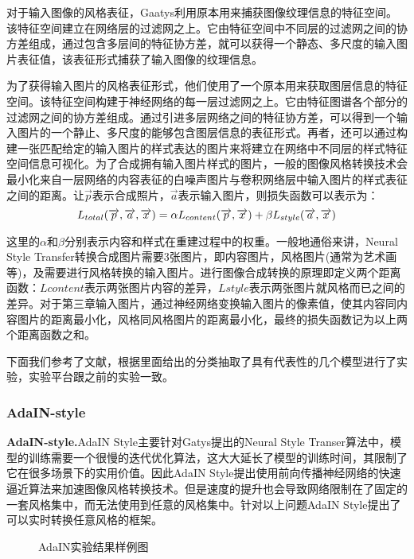 对于输入图像的风格表征，Gaatys利用原本用来捕获图像纹理信息的特征空间。该特征空间建立在网络层的过滤网之上。它由特征空间中不同层的过滤网之间的协方差组成，通过包含多层间的特征协方差，就可以获得一个静态、多尺度的输入图片表征值，该表征形式捕获了输入图像的纹理信息。

为了获得输入图片的风格表征形式，他们使用了一个原本用来获取图层信息的特征空间。该特征空间构建于神经网络的每一层过滤网之上。它由特征图谱各个部分的过滤网之间的协方差组成。通过引进多层网络之间的特征协方差，可以得到一个输入图片的一个静止、多尺度的能够包含图层信息的表征形式。再者，还可以通过构建一张匹配给定的输入图片的样式表达的图片来将建立在网络中不同层的样式特征空间信息可视化。为了合成拥有输入图片样式的图片，一般的图像风格转换技术会最小化来自一层网络的内容表征的白噪声图片与卷积网络层中输入图片的样式表征之间的距离。让$\overrightarrow{p}$表示合成照片，$\overrightarrow{a}$表示输入图片，则损失函数可以表示为：
$$
\centering
L_{total}(\overrightarrow{p},\overrightarrow{a}, \overrightarrow{x})=
\alpha L_{content}(\overrightarrow{p}, \overrightarrow{x}) +
\beta L_{style}(\overrightarrow{a}, \overrightarrow{x})
$$

这里的$\alpha$和$\beta$分别表示内容和样式在重建过程中的权重。一般地通俗来讲，Neural Style Transfer转换合成图片需要3张图片，即内容图片，风格图片(通常为艺术画等)，及需要进行风格转换的输入图片。进行图像合成转换的原理即定义两个距离函数：$Lcontent$表示两张图片内容的差异，$Lstyle$表示两张图片就风格而已之间的差异。对于第三章输入图片，通过神经网络变换输入图片的像素值，使其内容同内容图片的距离最小化，风格同风格图片的距离最小化，最终的损失函数记为以上两个距离函数之和。 

下面我们参考了文献\cite{nst-survey}，根据里面给出的分类抽取了具有代表性的几个模型进行了实验，实验平台跟之前的实验一致。

\subsubsection[AdaIN-style]{AdaIN-style}

\textbf{AdaIN-style.}\cite{adain}\quad AdaIN Style主要针对Gatys提出的Neural Style Transer算法中，模型的训练需要一个很慢的迭代优化算法，这大大延长了模型的训练时间，其限制了它在很多场景下的实用价值。因此AdaIN Style提出使用前向传播神经网络的快速逼近算法来加速图像风格转换技术。但是速度的提升也会导致网络限制在了固定的一套风格集中，而无法使用到任意的风格集中。针对以上问题AdaIN Style提出了可以实时转换任意风格的框架。

\begin{figure}[!hb]
    \centering
    \caption{AdaIN实验结果样例图}
    \label{fig:adin}
\end{figure}

